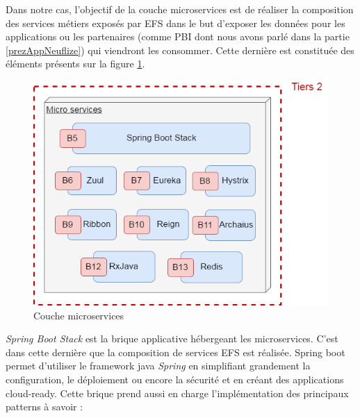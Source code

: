 		Dans notre cas, l'objectif de la couche microservices est de réaliser la composition des services métiers exposés par EFS dans le but d'exposer les données pour les applications ou les partenaires (comme PBI dont nous avons parlé dans la partie \ref{prezAppNeuflize}) qui viendront les consommer. Cette dernière est constituée des éléments présents sur la figure \ref{coucheMicroservices}.

\begin{figure}[H]
\raggedleft
	\includegraphics[scale=0.5]{images/travailNeuflizeOBC/architecture/coucheMicroservices.png}
	\centering
	\caption{Couche microservices}
	\label{coucheMicroservices}
\end{figure}
	
	\textit{Spring Boot Stack} est la brique applicative hébergeant les microservices. C’est dans cette dernière que la composition de services EFS est réalisée. Spring boot permet d'utiliser le framework java \textit{Spring} en simplifiant grandement la configuration, le déploiement ou encore la sécurité et en créant des applications cloud-ready.
	Cette brique prend aussi en charge l’implémentation des principaux patterns à savoir : \\
	
